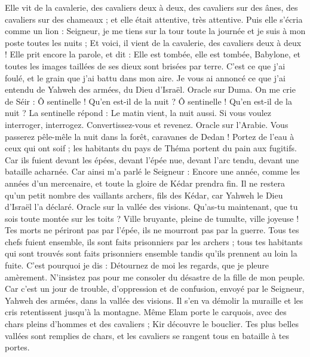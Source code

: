 \begin{multicols}{2}
Elle vit de la cavalerie, des cavaliers deux à deux, des cavaliers sur des ânes, des cavaliers sur des chameaux ; et elle était attentive, très attentive.
Puis elle s'écria comme un lion : Seigneur, je me tiens sur la tour toute la journée et je suis à mon poste toutes les nuits ;
Et voici, il vient de la cavalerie, des cavaliers deux à deux ! Elle prit encore la parole, et dit : Elle est tombée, elle est tombée, Babylone, et toutes les images taillées de ses dieux sont brisées par terre.
C'est ce que j'ai foulé, et le grain que j'ai battu dans mon aire. Je vous ai annoncé ce que j'ai entendu de Yahweh des armées, du Dieu d'Israël.
Oracle sur Duma. On me crie de Séir : Ô sentinelle ! Qu'en est-il de la nuit ? Ô sentinelle ! Qu'en est-il de la nuit ?
La sentinelle répond : Le matin vient, la nuit aussi. Si vous voulez interroger, interrogez. Convertissez-vous et revenez.
Oracle sur l'Arabie. Vous passerez pêle-mêle la nuit dans la forêt, caravanes de Dedan !
Portez de l'eau à ceux qui ont soif ; les habitants du pays de Théma portent du pain aux fugitifs.
Car ils fuient devant les épées, devant l'épée nue, devant l'arc tendu, devant une bataille acharnée.
Car ainsi m'a parlé le Seigneur : Encore une année, comme les années d'un mercenaire, et toute la gloire de Kédar prendra fin.
Il ne restera qu'un petit nombre des vaillants archers, fils des Kédar, car Yahweh le Dieu d'Israël l'a déclaré.
\VerseOne{}Oracle sur la vallée des visions. Qu'as-tu maintenant, que tu sois toute montée sur les toits ?
Ville bruyante, pleine de tumulte, ville joyeuse ! Tes morts ne périront pas par l'épée, ils ne mourront pas par la guerre.
Tous tes chefs fuient ensemble, ils sont faits prisonniers par les archers ; tous tes habitants qui sont trouvés sont faits prisonniers ensemble tandis qu'ils prennent au loin la fuite.
C'est pourquoi je dis : Détournez de moi les regards, que je pleure amèrement. N'insistez pas pour me consoler du désastre de la fille de mon peuple.
Car c'est un jour de trouble, d'oppression et de confusion, envoyé par le Seigneur, Yahweh des armées, dans la vallée des visions. Il s'en va démolir la muraille et les cris retentissent jusqu'à la montagne.
Même Elam porte le carquois, avec des chars pleins d'hommes et des cavaliers ; Kir découvre le bouclier.
Tes plus belles vallées sont remplies de chars, et les cavaliers se rangent tous en bataille à tes portes.

\end{multicols}
